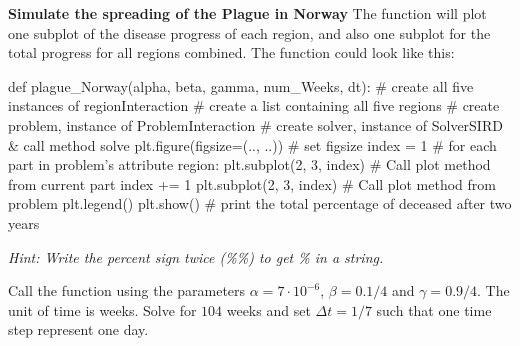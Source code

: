 \begin{Problem}{\textbf{Simulate the spreading of the Plague in Norway}}
The function will plot one subplot of the disease progress of each region, and also one subplot for the total progress for all regions combined.
The function could look like this:
\begin{python}
def plague_Norway(alpha, beta, gamma, num_Weeks, dt):
    # create all five instances of regionInteraction
    # create a list containing all five regions
    # create problem, instance of ProblemInteraction
    # create solver, instance of SolverSIRD & call method solve
    plt.figure(figsize=(.., ..)) # set figsize
    index = 1
    # for each part in problem's attribute region:
        plt.subplot(2, 3, index)
        # Call plot method from current part
        index += 1
    plt.subplot(2, 3, index)
    # Call plot method from problem
    plt.legend()
    plt.show()
    # print the total percentage of deceased after two years
\end{python}
 \textit{Hint: Write the percent sign twice (\%\%) to get \% in a string.}

Call the function using the parameters $\alpha= 7 \cdot 10^{-6}$, $\beta=0.1/4$ and $\gamma=0.9/4$. The unit of time is weeks. Solve for $104$ weeks and set $\Delta t = 1/7$ such that one time step represent one day.


\end{Problem}
